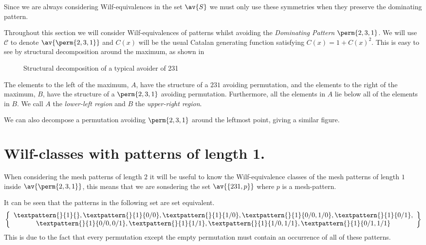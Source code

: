 Since we are always considering Wilf-equivalences in the set \(\av{S}\) we
must only use these symmetries when they preserve the dominating pattern.

Throughout this section we will consider Wilf-equivalences of patterns
whilst avoiding the \emph{Dominating Pattern} \(\perm{2,3,1}\). We will
use \(\mathcal{C}\) to denote \(\av{\perm{2,3,1}}\) and \(C(x)\) will
be the usual Catalan generating function satisfying \(C(x) = 1 + C(x)^2\).
This is easy to see by structural decomposition around the maximum, as
shown in 

\begin{figure}[!ht]
    \centering
    \caption{Structural decomposition of a typical avoider of 231}
    \label{fig:decompmax}
\end{figure}

The elements to the left of the maximum, \(A\), have the structure of a \(231\)
avoiding permutation, and the elements to the right of the maximum, \(B\), have the
structure of a \(\perm{2,3,1}\) avoiding permutation. Furthermore, all the
elements in \(A\) lie below all of the elements in \(B\). We call \(A\) the
\emph{lower-left region} and \(B\) the \emph{upper-right region}.

We can also decompose a permutation avoiding \(\perm{2,3,1}\) around the leftmost
point, giving a similar figure.

\section{Wilf-classes with patterns of length 1.}
When considering the mesh patterns of length \(2\) it will be useful to know
the Wilf-equivalence classes of the mesh patterns of length \(1\) inside
\(\av{\perm{2,3,1}}\), this means that we are sonsdering the set \(\av{\{231,p\}}\)
where \(p\) is a mesh-pattern.

It can be seen that the patterns in the following set are set equivalent.
\begin{equation*}
    \left\{
        \begin{array}{c}
        \textpattern{}{1}{},
        \textpattern{}{1}{0/0},
        \textpattern{}{1}{1/0},
        \textpattern{}{1}{0/0,1/0},
        \textpattern{}{1}{0/1},\\
        \textpattern{}{1}{0/0,0/1},
        \textpattern{}{1}{1/1},
        \textpattern{}{1}{1/0,1/1},
        \textpattern{}{1}{0/1,1/1}
    \end{array}
    \right\}
\end{equation*}
This is due to the fact that every permutation except the empty
permutation must contain an occurrence of all of these patterns.

